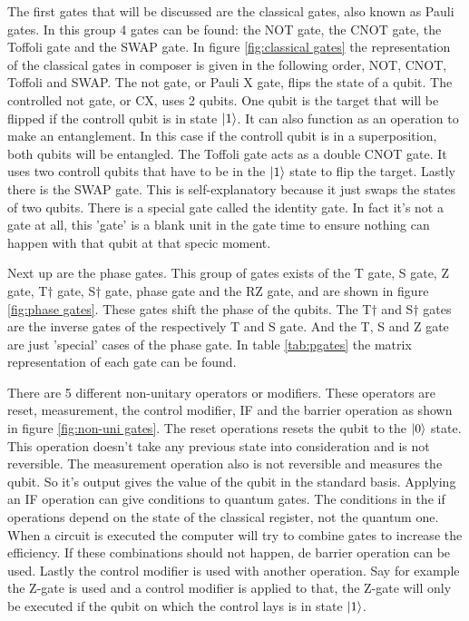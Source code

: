 The first gates that will be discussed are the classical gates, also known as Pauli gates. In this group 4 gates can be found: the NOT gate, the CNOT gate, the Toffoli gate and the SWAP gate.
In figure \ref{fig:classical gates} the representation of the classical gates in composer is given in the following order, NOT, CNOT, Toffoli and SWAP.
The not gate, or Pauli X gate, flips the state of a qubit. The controlled not gate, or CX, uses 2 qubits. One qubit is the target that will be flipped if the controll qubit is in state $\ket{1}$. It can also function as an operation to make an entanglement.
In this case if the controll qubit is in a superposition, both qubits will be entangled. The Toffoli gate acts as a double CNOT gate. It uses two controll qubits that have to be in the $\ket{1}$ state to flip the target.
Lastly there is the SWAP gate. This is self-explanatory because it just swaps the states of two qubits. There is a special gate called the identity gate. In fact it's not a gate at all, this 'gate' is a blank unit in the gate time to ensure nothing can happen with that qubit at that specic moment.

Next up are the phase gates. This group of gates exists of the T gate, S gate, Z gate, T$\dagger$ gate, S$\dagger$ gate, phase gate and the RZ gate, and are shown in figure \ref{fig:phase gates}. These gates shift the phase of the qubits.
The T$\dagger$ and S$\dagger$ gates are the inverse gates of the respectively T and S gate. And the T, S and Z gate are just 'special' cases of the phase gate.
In table \ref{tab:pgates} the matrix representation of each gate can be found.

There are 5 different non-unitary operators or modifiers. These operators are reset, measurement, the control modifier, IF and the barrier operation as shown in figure \ref{fig:non-uni gates}.
The reset operations resets the qubit to the $\ket{0}$ state. This operation doesn't take any previous state into consideration and is not reversible.
The measurement operation also is not reversible and measures the qubit. So it's output gives the value of the qubit in the standard basis.
Applying an IF operation can give conditions to quantum gates. The conditions in the if operations depend on the state of the classical register, not the quantum one.
When a circuit is executed the computer will try to combine gates to increase the efficiency. If these combinations should not happen, de barrier operation can be used.
Lastly the control modifier is used with another operation. Say for example the Z-gate is used and a control modifier is applied to that, the Z-gate will only be executed if the qubit on which the control lays is in state $\ket{1}$.

